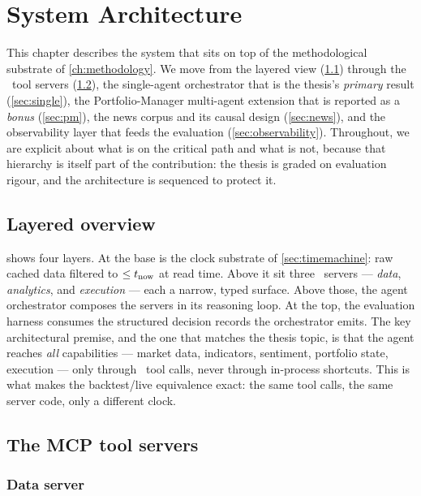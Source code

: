 \chapter{System Architecture}
\label{ch:architecture}

This chapter describes the system that sits on top of the methodological substrate of
\cref{ch:methodology}. We move from the layered view (\cref{sec:layers}) through the
\mcp\ tool servers (\cref{sec:servers}), the single-agent orchestrator that is the thesis's
\emph{primary} result (\cref{sec:single}), the Portfolio-Manager multi-agent extension that
is reported as a \emph{bonus} (\cref{sec:pm}), the news corpus and its causal design
(\cref{sec:news}), and the observability layer that feeds the evaluation
(\cref{sec:observability}). Throughout, we are explicit about what is on the critical path
and what is not, because that hierarchy is itself part of the contribution: the thesis is
graded on evaluation rigour, and the architecture is sequenced to protect it.



\section{Layered overview}
\label{sec:layers}

 shows four layers. At the base is the clock substrate of
\cref{sec:timemachine}: raw cached data filtered to $\le t_{\text{now}}$ at read time. Above it sit
three \mcp\ servers --- \emph{data}, \emph{analytics}, and \emph{execution} --- each a
narrow, typed surface. Above those, the agent orchestrator composes the servers in its
reasoning loop. At the top, the evaluation harness consumes the structured decision records
the orchestrator emits. The key architectural premise, and the one that matches the thesis
topic, is that the agent reaches \emph{all} capabilities --- market data, indicators,
sentiment, portfolio state, execution --- only through \mcp\ tool calls, never through
in-process shortcuts. This is what makes the backtest/live equivalence exact: the same tool
calls, the same server code, only a different clock.

\section{The MCP tool servers}
\label{sec:servers}

\subsection{Data server}


